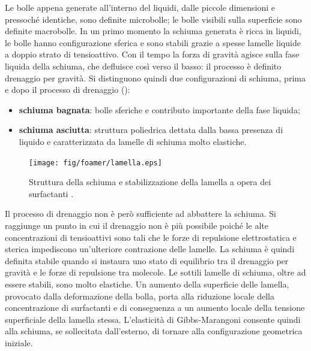 Le bolle appena generate all'interno del liquidi, dalle piccole dimensioni e pressoché identiche, sono definite microbolle; le bolle visibili sulla superficie sono definite macrobolle. In un primo momento la schiuma generata è ricca in liquidi, le bolle hanno configurazione sferica e sono stabili grazie a spesse lamelle liquide a doppio strato di tensioattivo. Con il tempo la forza di gravità agisce sulla fase liquida della schiuma, che defluisce così verso il basso: il processo è definito drenaggio per gravità. Si distinguono quindi due configurazioni di schiuma, prima e dopo il processo di drenaggio ():
\begin{itemize}
    \item \textbf{schiuma bagnata}: bolle sferiche e contributo importante della fase liquida;
    \item \textbf{schiuma asciutta}: struttura poliedrica dettata dalla bassa presenza di liquido e caratterizzata da lamelle di schiuma molto elastiche.
\end{itemize}

\begin{figure}[htbp]
    \centering
    \texttt{[image: fig/foamer/lamella.eps]}
    \caption{Struttura della schiuma e stabilizzazione della lamella a opera dei surfactanti \parencite{tego2014brochure}.}
    \label{fig:lamella}
\end{figure}

Il processo di drenaggio non è però sufficiente ad abbattere la schiuma. Si raggiunge un punto in cui il drenaggio non è più possibile poiché le alte concentrazioni di tensioattivi sono tali che le forze di repulsione elettrostatica e sterica impediscono un'ulteriore contrazione delle lamelle. La schiuma è quindi definita stabile quando si instaura uno stato di equilibrio tra il drenaggio per gravità e le forze di repulsione tra molecole.
Le sottili lamelle di schiuma, oltre ad essere stabili, sono molto elastiche. Un aumento della superficie delle lamella, provocato dalla deformazione della bolla, porta alla riduzione locale della concentrazione di surfactanti e di conseguenza a un aumento locale della tensione superficiale della lamella stessa. L'elasticità di Gibbs-Marangoni consente quindi alla schiuma, se sollecitata dall'esterno, di tornare alla configurazione geometrica iniziale.

